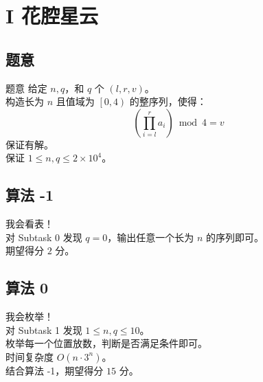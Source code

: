 \documentclass[11pt, fontset = fandol]{ctexbeamer}
\begin{document}
\section{I 花腔星云}
\subsection{题意}
\begin{frame}
  \begin{block}{题意}
    给定 $n, q$，和 $q$ 个 $\left(l, r, v\right)$。\\
    构造长为 $n$ 且值域为 $\left[0, 4\right)$ 的整序列，使得：$$\left(\prod_{i=l}^r a_i\right) \bmod 4 = v$$
      保证有解。\\
      保证 $1 \le n, q \le 2 \times {10}^4$。
  \end{block}
\end{frame}

\subsection{算法 -1}
\begin{frame}
  \pause
  我会看表！\\
  \pause
  对 Subtask 0 发现 $q=0$，输出任意一个长为 $n$ 的序列即可。\\
  \pause
  期望得分 $2$ 分。
\end{frame}

\subsection{算法 0}
\begin{frame}
  \pause
  我会枚举！\\
  \pause
  对 Subtask 1 发现 $1 \le n, q \le 10$。\\
  枚举每一个位置放数，判断是否满足条件即可。\\
  \pause
  时间复杂度 $O(n \cdot 3^n)$。\\
  结合算法 -1，期望得分 $15$ 分。
\end{frame}
\end{document}
